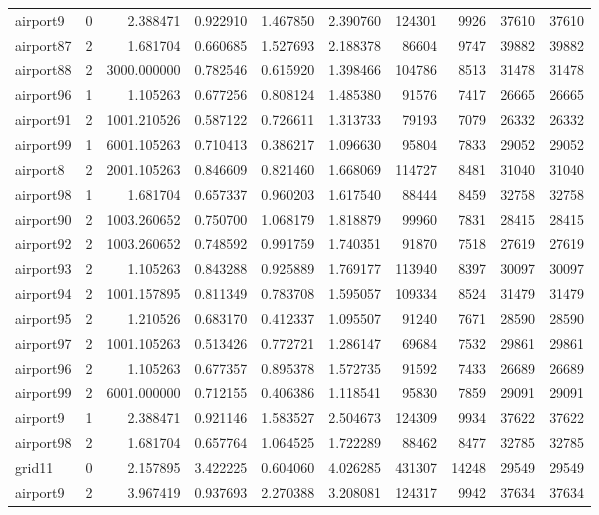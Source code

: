 \begin{longtable}{|l|r|r|r|r|r|r|r|r|r|}
airport9 & 0 & 2.388471 & 0.922910 & 1.467850 & 2.390760 & 124301 & 9926 & 37610 & 37610 \\
airport87 & 2 & 1.681704 & 0.660685 & 1.527693 & 2.188378 & 86604 & 9747 & 39882 & 39882 \\
airport88 & 2 & 3000.000000 & 0.782546 & 0.615920 & 1.398466 & 104786 & 8513 & 31478 & 31478 \\
airport96 & 1 & 1.105263 & 0.677256 & 0.808124 & 1.485380 & 91576 & 7417 & 26665 & 26665 \\
airport91 & 2 & 1001.210526 & 0.587122 & 0.726611 & 1.313733 & 79193 & 7079 & 26332 & 26332 \\
airport99 & 1 & 6001.105263 & 0.710413 & 0.386217 & 1.096630 & 95804 & 7833 & 29052 & 29052 \\
airport8 & 2 & 2001.105263 & 0.846609 & 0.821460 & 1.668069 & 114727 & 8481 & 31040 & 31040 \\
airport98 & 1 & 1.681704 & 0.657337 & 0.960203 & 1.617540 & 88444 & 8459 & 32758 & 32758 \\
airport90 & 2 & 1003.260652 & 0.750700 & 1.068179 & 1.818879 & 99960 & 7831 & 28415 & 28415 \\
airport92 & 2 & 1003.260652 & 0.748592 & 0.991759 & 1.740351 & 91870 & 7518 & 27619 & 27619 \\
airport93 & 2 & 1.105263 & 0.843288 & 0.925889 & 1.769177 & 113940 & 8397 & 30097 & 30097 \\
airport94 & 2 & 1001.157895 & 0.811349 & 0.783708 & 1.595057 & 109334 & 8524 & 31479 & 31479 \\
airport95 & 2 & 1.210526 & 0.683170 & 0.412337 & 1.095507 & 91240 & 7671 & 28590 & 28590 \\
airport97 & 2 & 1001.105263 & 0.513426 & 0.772721 & 1.286147 & 69684 & 7532 & 29861 & 29861 \\
airport96 & 2 & 1.105263 & 0.677357 & 0.895378 & 1.572735 & 91592 & 7433 & 26689 & 26689 \\
airport99 & 2 & 6001.000000 & 0.712155 & 0.406386 & 1.118541 & 95830 & 7859 & 29091 & 29091 \\
airport9 & 1 & 2.388471 & 0.921146 & 1.583527 & 2.504673 & 124309 & 9934 & 37622 & 37622 \\
airport98 & 2 & 1.681704 & 0.657764 & 1.064525 & 1.722289 & 88462 & 8477 & 32785 & 32785 \\
grid11 & 0 & 2.157895 & 3.422225 & 0.604060 & 4.026285 & 431307 & 14248 & 29549 & 29549 \\
airport9 & 2 & 3.967419 & 0.937693 & 2.270388 & 3.208081 & 124317 & 9942 & 37634 & 37634 \\

\end{longtable}
